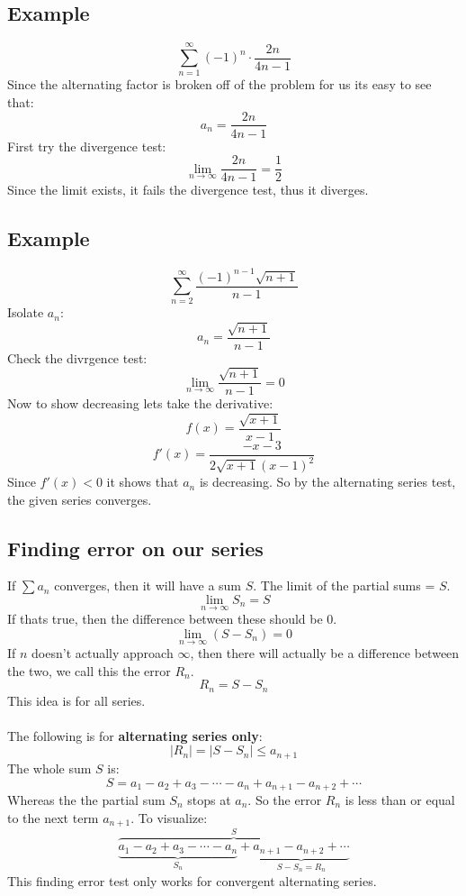 \documentclass{report}
\begin{document}
    \subsection{Example}
        \[\sum_{n = 1}^{\infty} (-1)^n \cdot \frac{2n}{4n-1} \]
        Since the alternating factor is broken off of the problem for us its easy to see that:
        \[a_n = \frac{2n}{4n-1}\]
        First try the divergence test:
        \[\lim_{n \to \infty} \frac{2n}{4n-1} = \frac{1}{2}\]
        Since the limit exists, it fails the divergence test, thus it diverges.
        
    \subsection{Example}
        \[\sum_{n=2}^{\infty} \frac{(-1)^{n-1} \sqrt{n+1}}{n-1}\]
        Isolate \(a_n\):
        \[a_n = \frac{\sqrt{n+1}}{n-1}\]
        Check the divrgence test:
        \[\lim_{n \to \infty} \frac{\sqrt{n+1}}{n-1} = 0\]
        Now to show decreasing lets take the derivative:
        \[f(x) = \frac{\sqrt{x+1}}{x-1}\]
        \[f'(x) = \frac{-x-3}{2\sqrt{x+1}(x-1)^2}\]
        Since \(f'(x) < 0\) it shows that \(a_n\) is decreasing. So by the alternating series test, the given series converges.
    
    \subsection{Finding error on our series}
        If \(\sum a_n\) converges, then it will have a sum \(S\). The limit of the partial sums = \(S\).
        \[\lim_{n \to \infty}  S_n = S\]
        If thats true, then the difference between these should be 0.
        \[\lim_{n \to \infty} (S - S_n) = 0\]
        If \(n\) doesn't actually approach \(\infty\), then there will actually be a difference between the two, we call this the error \(R_n\).
        \[R_n = S - S_n\]
        This idea is for all series.\\
        \\
        The following is for \textbf{alternating series only}:
        \[|R_n| = |S - S_n| \leq a_{n+1}\]
        The whole sum \(S\) is:
        \[S=a_1 - a_2 + a_3 - \cdots - a_n + a_{n+1} - a_{n+2} + \cdots\]
        Whereas the the partial sum \(S_n\) stops at \(a_n\). So the error \(R_n\) is less than or equal to the next term \(a_{n+1}\).
        To visualize:
        \[\overbrace{\underbrace{a_1 - a_2 + a_3 - \cdots - a_n}_{S_n} + \underbrace{a_{n+1} - a_{n+2} + \cdots}_{S - S_n = R_n}}^{S} \]
        This finding error test only works for convergent alternating series.
        
\end{document}
